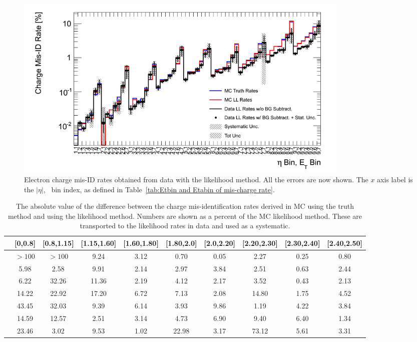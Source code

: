  \begin{figure}[htp]
 \centering
 \includegraphics[width=0.8\textwidth]{figures/ChargeMisID/Validation_ChargeMisIDRates_PTvsEta_FinalRateWithSys.png}
 \caption{Electron charge mis-ID rates obtained from data with the likelihood method. All the errors are now shown. The $x$ axis label is
  the $|\eta|$, \pt\ bin index, as defined in Table~\ref{tab:Etbin and Etabin of mis-charge rate}.}
 \label{fig:ChargeMisID_truthRate_finalFig}
 \end{figure}

\begin{table}
\footnotesize
\centering
\begin{tabular}{c|c|c|c|c|c|c|c|c|c}
  \hline
  \backslashbox{\pt[\GeV]}{$|$\eta$|$} &[0,0.8] &[0.8,1.15] &[1.15,1.60] &[1.60,1.80] &[1.80,2.0] &[2.0,2.20] &[2.20,2.30] &[2.30,2.40] &[2.40,2.50] \\
  \hline
  [15,30] & $> 100$ & $> 100$ &9.24 &3.12 &0.70 &0.05 &2.27 &0.25 &0.80 \\
  \hline
  [30,40] & 5.98 &2.58 &9.91 &2.14 &2.97 &3.84 &2.51 &0.63 &2.44\\
  \hline
  [40,50] & 6.22 &32.26 &11.36 &2.19 &4.12 &2.17 &3.52 &0.43 &2.13 \\
  \hline
  [50,60] & 14.22 &22.92 &17.20 &6.72 &7.13 &2.08 &14.80 &1.75 &4.52 \\
  \hline
  [60,80] & 43.45 &32.03 &9.39 &6.14 &3.93 &9.86 &1.19 &4.22 &3.84 \\
  \hline
  [80,120] & 14.59 &12.57 &2.51 &3.14 &4.73 &6.90 &9.40 &6.40 &1.34 \\
  \hline
  [120,1000] & 23.46 &3.02 &9.53 &1.02 &22.98 &3.17 &73.12 &5.61 &3.31 \\
  \hline
\end{tabular}
\caption{The absolute value of the difference between the charge mis-identification rates derived in MC using the truth method and using the likelihood method.  Numbers
are shown as a percent of the MC likelihood method.  These are transported to the likelihood rates in data and used as a systematic. }
\label{tab:MCLLTruthSys}
\end{table}



